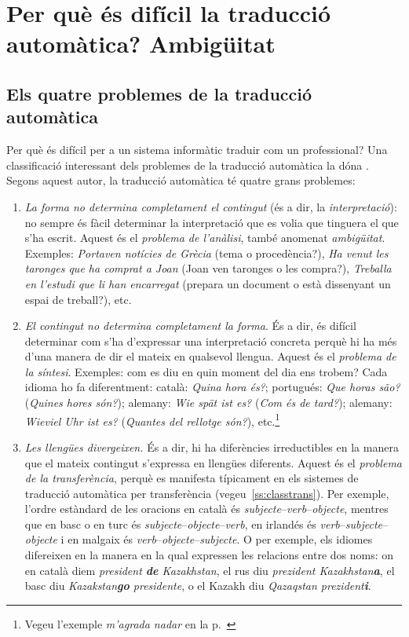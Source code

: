 \chapter[Per què és difícil la TA? Ambigüitat.]{Per què és difícil la
  traducció automàtica? Ambigüitat}
\label{se:ambig}


\section{Els quatre problemes de la traducció automàtica}
Per què és difícil per a un sistema informàtic traduir com un
professional?  Una classificació interessant dels problemes de la
traducció automàtica la dóna \cite{arnold03p}. Segons aquest autor, la
traducció automàtica té quatre grans problemes:
\begin{enumerate}
\item \emph{La forma no determina completament el contingut} (és a
  dir, la \emph{interpretació}): no sempre és fàcil determinar la
  interpretació que es volia que tinguera el que s'ha escrit. Aquest
  és el \emph{problema de l'anàlisi}, també anomenat
  \emph{ambigüitat}. Exemples: \emph{Portaven notícies de Grècia}
  (tema o procedència?), \emph{Ha venut les taronges que ha comprat a
    Joan} (Joan ven taronges o les compra?), \emph{Treballa en
    l'estudi que li han encarregat} (prepara un document o està
  dissenyant un espai de treball?), etc.

\item \emph{El contingut no determina completament la forma}. És a
  dir, és difícil determinar com s'ha d'expressar una interpretació
  concreta perquè hi ha més d'una manera de dir el mateix en qualsevol
  llengua. Aquest és el \emph{problema de la síntesi}. Exemples: com
  es diu en quin moment del dia ens trobem?  Cada idioma ho fa
  diferentment: català: \emph{Quina hora és?}; portugués: \emph{Que
    horas são?} (\emph{Quines hores són?}); alemany: \emph{Wie spät
    ist es?} (\emph{Com és de tard?}); alemany: \emph{Wieviel Uhr ist
    es?} (\emph{Quantes del rellotge són?}), etc.\footnote{Vegeu
    l'exemple \emph{m'agrada nadar} en la
    p.~\pageref{pg:magradanadar}}

\item \emph{Les llengües divergeixen.} És a dir, hi ha diferències
  irreductibles en la manera que el mateix contingut s'expressa en
  llengües diferents. Aquest és el \emph{problema de la
    transferència}, perquè es manifesta típicament en els sistemes de
  traducció automàtica per transferència
  (vegeu~\ref{ss:classtrans}). Per exemple, l'ordre estàndard de les
  oracions en català és \emph{subjecte}--\emph{verb}--\emph{objecte},
  mentres que en basc o en turc és
  \emph{subjecte}--\emph{objecte}--\emph{verb}, en irlandés és
  \emph{verb}--\emph{subjecte}--\emph{objecte} i en malgaix és
  \emph{verb}--\emph{objecte}--\emph{subjecte}.  O per exemple, els
  idiomes difereixen en la manera en la qual expressen les relacions
  entre dos noms: on en català diem \emph{president \textbf{de}
    Kazakhstan}, el rus diu \emph{prezident Kazakhstan\textbf{a}}, el
  basc diu \emph{Kazakstan\textbf{go} presidente}, o el Kazakh diu
  \emph{Qazaqstan prezident\textbf{i}}.


\end{enumerate}
